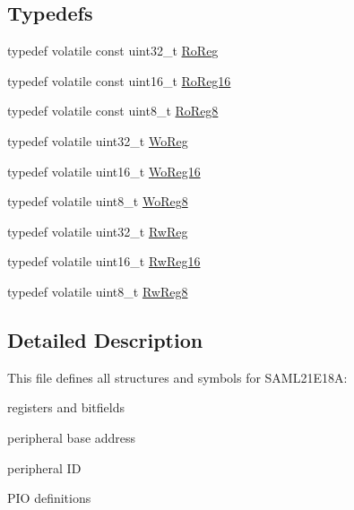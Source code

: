 \subsection*{Typedefs}
\begin{DoxyCompactItemize}
\item 
typedef volatile const uint32\+\_\+t \hyperlink{group___s_a_m_l21_e18_a__definitions_ga5d556f8391af4141be23f7334ac9dd68}{Ro\+Reg}
\item 
typedef volatile const uint16\+\_\+t \hyperlink{group___s_a_m_l21_e18_a__definitions_gaebf6e33c2d49a802e06e22a95ea9d0d0}{Ro\+Reg16}
\item 
typedef volatile const uint8\+\_\+t \hyperlink{group___s_a_m_l21_e18_a__definitions_ga0d957f1433aaf5d70e4dc2b68288442d}{Ro\+Reg8}
\item 
typedef volatile uint32\+\_\+t \hyperlink{group___s_a_m_l21_e18_a__definitions_gac0f96d4e8018367b38f527007cf0eafd}{Wo\+Reg}
\item 
typedef volatile uint16\+\_\+t \hyperlink{group___s_a_m_l21_e18_a__definitions_ga0ab0e5f6c8301aa1c2068e511d854094}{Wo\+Reg16}
\item 
typedef volatile uint8\+\_\+t \hyperlink{group___s_a_m_l21_e18_a__definitions_ga5e336e5a36ee12ebeafb021108e5275b}{Wo\+Reg8}
\item 
typedef volatile uint32\+\_\+t \hyperlink{group___s_a_m_l21_e18_a__definitions_gacf1496e3bbe303e55f627fc7558a68c7}{Rw\+Reg}
\item 
typedef volatile uint16\+\_\+t \hyperlink{group___s_a_m_l21_e18_a__definitions_gacce07556c80fc352ae607f225f19fed5}{Rw\+Reg16}
\item 
typedef volatile uint8\+\_\+t \hyperlink{group___s_a_m_l21_e18_a__definitions_gae361754be775bb192f85821d3ab33c17}{Rw\+Reg8}
\end{DoxyCompactItemize}


\subsection{Detailed Description}
This file defines all structures and symbols for S\+A\+M\+L21\+E18\+A\+:
\begin{DoxyItemize}
\item registers and bitfields
\item peripheral base address
\item peripheral I\+D
\item P\+I\+O definitions 
\end{DoxyItemize}

